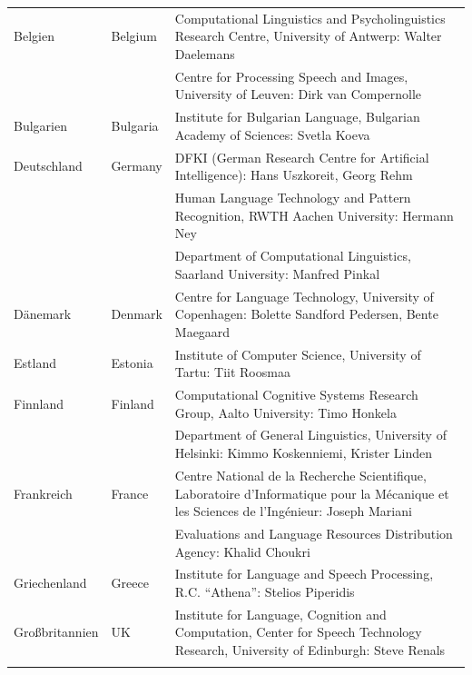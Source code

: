 \documentclass[]{../../metanetpaper}
\begin{document}
\begin{Parallel}[c]{79mm}{78mm}
  \ParallelPar
 

  \ParallelPar

  \begin{longtable}{@{}llp{105mm}@{}}
Belgien & Belgium & Computational Linguistics and Psycholinguistics Research Centre, University of Antwerp: Walter Daelemans\\ \addlinespace
& & Centre for Processing Speech and Images, University of Leuven: Dirk van Compernolle \\ \addlinespace
Bulgarien & Bulgaria & Institute for Bulgarian Language, Bulgarian Academy of Sciences: Svetla Koeva \\ \addlinespace
Deutschland & Germany & DFKI (German Research Centre for Artificial Intelligence): Hans Uszkoreit, Georg Rehm\\ \addlinespace
& & Human Language Technology and Pattern Recognition, RWTH Aachen University: Hermann Ney \\ \addlinespace
& & Department of Computational Linguistics, Saarland University: Manfred Pinkal\\ \addlinespace Dänemark &  Denmark & Centre for Language Technology, University of Copenhagen: Bolette Sandford Pedersen, Bente Maegaard\\ \addlinespace
Estland & Estonia & Institute of Computer Science, University of Tartu: Tiit Roosmaa\\ \addlinespace
Finnland & Finland & Computational Cognitive Systems Research Group, Aalto University: Timo Honkela\\ \addlinespace
& & Department of General Linguistics, University of Helsinki: Kimmo Koskenniemi, Krister Linden \\ \addlinespace
Frankreich & France & Centre National de la Recherche Scientifique, Laboratoire d'Informatique pour la Mécanique et les Sciences de l'Ingénieur: Joseph Mariani \\ \addlinespace
& & Evaluations and Language Resources Distribution Agency: Khalid Choukri\\ \addlinespace 
Griechenland & Greece & Institute for Language and Speech Processing, R.C. “Athena”: Stelios Piperidis\\ \addlinespace
Großbritannien & UK & Institute for Language, Cognition and Computation, Center for Speech Technology Research, University of Edinburgh: Steve Renals \\ \addlinespace 

\end{longtable}
\end{Parallel}
\end{document}
